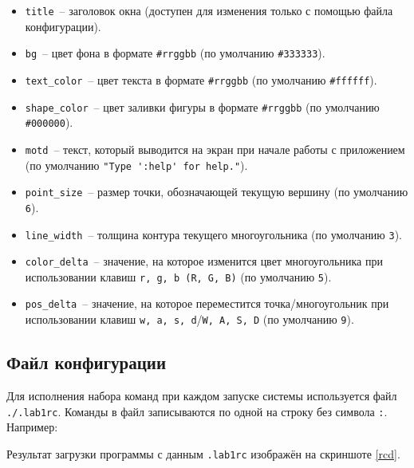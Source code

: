 \documentclass[oneside, final, 10pt]{extarticle}
\begin{document}
\begin{itemize}
	\item \verb~title~~-- заголовок окна (доступен для изменения только с помощью файла конфигурации).
	\item \verb~bg~~-- цвет фона в формате \verb~#rrggbb~ (по умолчанию \verb~#333333~).
	\item \verb~text_color~~-- цвет текста в формате \verb~#rrggbb~ (по умолчанию \verb~#ffffff~).
	\item \verb~shape_color~~-- цвет заливки фигуры в формате \verb~#rrggbb~ (по умолчанию \verb~#000000~).
	\item \verb~motd~~-- текст, который выводится на экран при начале работы с приложением (по умолчанию \verb~"Type ':help' for help."~).
	\item \verb~point_size~~-- размер точки, обозначающей текущую вершину (по умолчанию \verb~6~).
	\item \verb~line_width~~-- толщина контура текущего многоугольника (по умолчанию \verb~3~).
	\item \verb~color_delta~~-- значение, на которое изменится цвет многоугольника при использовании клавиш \verb~r, g, b (R, G, B)~ (по умолчанию \verb~5~).
	\item \verb~pos_delta~~-- значение, на которое переместится точка/многоугольник при использовании клавиш \verb~w, a, s, d~/\verb~W, A, S, D~ (по умолчанию \verb~9~).
\end{itemize}

\subsection{Файл конфигурации}

Для исполнения набора команд при каждом запуске системы используется файл \verb~./.lab1rc~. Команды в файл записываются по одной на строку без символа \verb~:~. Например:

\lstset{caption=.lab1rc}


Результат загрузки программы с данным \verb~.lab1rc~ изображён на скриншоте \ref{rcd}.
\end{document}
